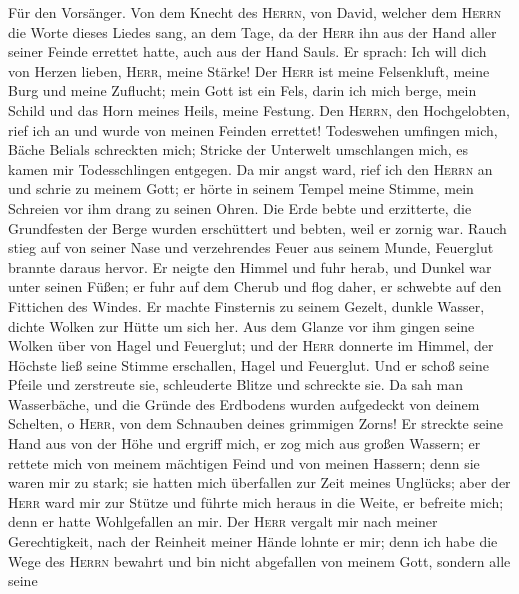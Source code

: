  Für den Vorsänger. Von dem Knecht des \textsc{Herrn}, von
David, welcher dem \textsc{Herrn} die Worte dieses Liedes sang, an dem
Tage, da der \textsc{Herr} ihn aus der Hand aller seiner Feinde errettet
hatte, auch aus der Hand Sauls. Er sprach: Ich will dich von Herzen
lieben, \textsc{Herr}, meine Stärke!  Der \textsc{Herr}
ist meine Felsenkluft, meine Burg und meine Zuflucht; mein Gott ist ein
Fels, darin ich mich berge, mein Schild und das Horn meines Heils, meine
Festung.  Den \textsc{Herrn}, den Hochgelobten, rief ich
an und wurde von meinen Feinden errettet!  Todeswehen
umfingen mich, Bäche Belials schreckten mich;  Stricke der
Unterwelt umschlangen mich, es kamen mir Todesschlingen entgegen.
 Da mir angst ward, rief ich den \textsc{Herrn} an und
schrie zu meinem Gott; er hörte in seinem Tempel meine Stimme, mein
Schreien vor ihm drang zu seinen Ohren.  Die Erde bebte
und erzitterte, die Grundfesten der Berge wurden erschüttert und bebten,
weil er zornig war.  Rauch stieg auf von seiner Nase und
verzehrendes Feuer aus seinem Munde, Feuerglut brannte daraus hervor.
 Er neigte den Himmel und fuhr herab, und Dunkel war unter
seinen Füßen;  er fuhr auf dem Cherub und flog daher, er
schwebte auf den Fittichen des Windes.  Er machte
Finsternis zu seinem Gezelt, dunkle Wasser, dichte Wolken zur Hütte um
sich her.  Aus dem Glanze vor ihm gingen seine Wolken
über von Hagel und Feuerglut;  und der \textsc{Herr}
donnerte im Himmel, der Höchste ließ seine Stimme erschallen, Hagel und
Feuerglut.  Und er schoß seine Pfeile und zerstreute sie,
schleuderte Blitze und schreckte sie.  Da sah man
Wasserbäche, und die Gründe des Erdbodens wurden aufgedeckt von deinem
Schelten, o \textsc{Herr}, von dem Schnauben deines grimmigen Zorns!
 Er streckte seine Hand aus von der Höhe und ergriff
mich, er zog mich aus großen Wassern;  er rettete mich
von meinem mächtigen Feind und von meinen Hassern; denn sie waren mir zu
stark;  sie hatten mich überfallen zur Zeit meines
Unglücks; aber der \textsc{Herr} ward mir zur Stütze  und
führte mich heraus in die Weite, er befreite mich; denn er hatte
Wohlgefallen an mir.  Der \textsc{Herr} vergalt mir nach
meiner Gerechtigkeit, nach der Reinheit meiner Hände lohnte er mir;
 denn ich habe die Wege des \textsc{Herrn} bewahrt und
bin nicht abgefallen von meinem Gott,  sondern alle seine
